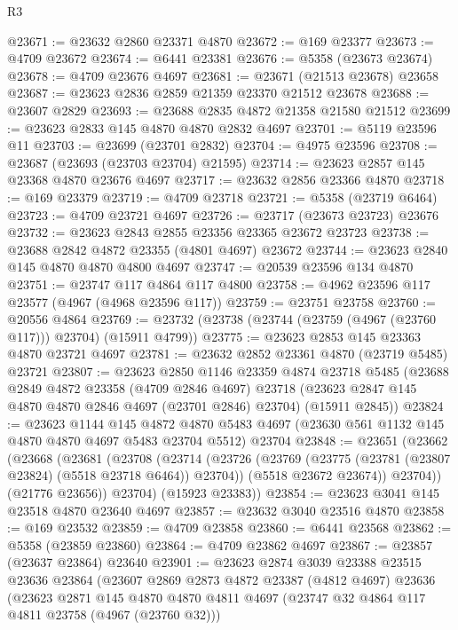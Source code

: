 \begin{lexlean}{R3}
\begin{coremodule}
@23671 := @23632 @2860 @23371 @4870
@23672 := @169 @23377
@23673 := @4709 @23672
@23674 := @6441 @23381
@23676 := @5358 (@23673 @23674)
@23678 := @4709 @23676 @4697
@23681 := @23671 (@21513 @23678) @23658
@23687 := @23623 @2836 @2859 @21359 @23370 @21512 @23678
@23688 := @23607 @2829
@23693 := @23688 @2835 @4872 @21358 @21580 @21512
@23699 := @23623 @2833 @145 @4870 @4870 @2832 @4697
@23701 := @5119 @23596 @11
@23703 := @23699 (@23701 @2832)
@23704 := @4975 @23596
@23708 := @23687 (@23693 (@23703 @23704) @21595)
@23714 := @23623 @2857 @145 @23368 @4870 @23676 @4697
@23717 := @23632 @2856 @23366 @4870
@23718 := @169 @23379
@23719 := @4709 @23718
@23721 := @5358 (@23719 @6464)
@23723 := @4709 @23721 @4697
@23726 := @23717 (@23673 @23723) @23676
@23732 := @23623 @2843 @2855 @23356 @23365 @23672 @23723
@23738 := @23688 @2842 @4872 @23355 (@4801 @4697) @23672
@23744 := @23623 @2840 @145 @4870 @4870 @4800 @4697
@23747 := @20539 @23596 @134 @4870
@23751 := @23747 @117 @4864 @117 @4800
@23758 := @4962 @23596 @117 @23577 (@4967 (@4968 @23596 @117))
@23759 := @23751 @23758
@23760 := @20556 @4864
@23769 := @23732 (@23738 (@23744 (@23759 (@4967 (@23760 @117))) @23704) (@15911 @4799))
@23775 := @23623 @2853 @145 @23363 @4870 @23721 @4697
@23781 := @23632 @2852 @23361 @4870 (@23719 @5485) @23721
@23807 := @23623
    @2850
    @1146
    @23359
    @4874
    @23718
    @5485
    (@23688
      @2849
      @4872
      @23358
      (@4709 @2846 @4697)
      @23718
      (@23623 @2847 @145 @4870 @4870 @2846 @4697 (@23701 @2846) @23704)
      (@15911 @2845))
@23824 := @23623
    @1144
    @145
    @4872
    @4870
    @5483
    @4697
    (@23630 @561 @1132 @145 @4870 @4870 @4697 @5483 @23704 @5512)
    @23704
@23848 := @23651
    (@23662
      (@23668
        (@23681
          (@23708
            (@23714
              (@23726
                (@23769 (@23775 (@23781 (@23807 @23824) (@5518 @23718 @6464)) @23704))
                (@5518 @23672 @23674))
              @23704))
          (@21776 @23656))
        @23704)
      (@15923 @23383))
@23854 := @23623 @3041 @145 @23518 @4870 @23640 @4697
@23857 := @23632 @3040 @23516 @4870
@23858 := @169 @23532
@23859 := @4709 @23858
@23860 := @6441 @23568
@23862 := @5358 (@23859 @23860)
@23864 := @4709 @23862 @4697
@23867 := @23857 (@23637 @23864) @23640
@23901 := @23623
    @2874
    @3039
    @23388
    @23515
    @23636
    @23864
    (@23607
      @2869
      @2873
      @4872
      @23387
      (@4812 @4697)
      @23636
      (@23623
        @2871
        @145
        @4870
        @4870
        @4811
        @4697
        (@23747 @32 @4864 @117 @4811 @23758 (@4967 (@23760 @32)))

\end{coremodule}
\end{lexlean}
